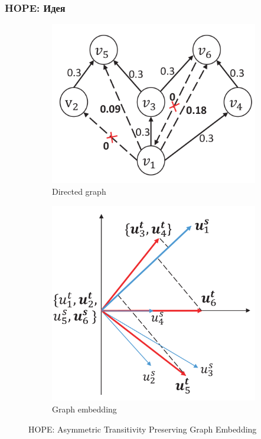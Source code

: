 \documentclass[xcolor=table,english]{beamer}
\begin{document}
\begin{frame}[fragile] \frametitle{HOPE: Идея}
    \begin{minipage}[m]{\linewidth}
        \begin{figure}
            \centering
            \begin{subfigure}[b]{0.45\textwidth}
                \includegraphics[width=\textwidth]{figures/hope_graph.png}
                \caption{Directed graph}
            \end{subfigure}
            \hfill
            \begin{subfigure}[b]{0.45\textwidth}
                \includegraphics[width=\textwidth]{figures/hope_embedding.png}
                \caption{Graph embedding}
            \end{subfigure}
            \caption{HOPE: Asymmetric Transitivity Preserving Graph Embedding}
        \end{figure}
    \end{minipage}\hfill
\end{frame}
\end{document}
